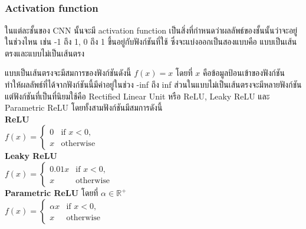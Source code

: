 \subsubsection{Activation function\textsuperscript{\cite{activation}}}
ในแต่ละชั้นของ CNN นั้นจะมี activation function เป็นสิ่งที่กำหนดว่าผลลัพธ์ของชั้นนั้นว่าจะอยู่ในช่วงไหน 
เช่น -1 ถึง 1, 0 ถึง 1 ขึ้นอยู่กับฟังก์ชันที่ใช้ ซึ่งจะแบ่งออกเป็นสองแบบคือ แบบเป็นเส้นตรงและแบบไม่เป็นเส้นตรง

แบบเป็นเส้นตรงจะมีสมการของฟังก์ชันดังนี้ $ f(x) = x $ โดยที่ $x$ คือข้อมูลป้อนเข้าของฟังก์ชัน ทำให้ผลลัพธ์ที่ได้จากฟังก์ชันนี้มีค่าอยู่ในช่วง -inf ถึง inf
ส่วนในแบบไม่เป็นเส้นตรงจะมีหลายฟังก์ชัน แต่ฟังก์ชันที่เป็นที่นิยมใช้คือ Rectified Linear Unit หรือ ReLU, Leaky ReLU และ Parametric ReLU โดยทั้งสามฟังก์ชันมีสมการดังนี้\\
\textbf{ReLU}\\
$ f(x) =
\begin{cases}
	0 & \text{if } x < 0,\\
	x & \text{otherwise}
\end{cases}
$\\
\textbf{Leaky ReLU}\\
$ f(x) =
\begin{cases}
	0.01x & \text{if } x < 0,\\
	x & \text{otherwise}
\end{cases}
$\\
\textbf{Parametric ReLU} โดยที่ $\alpha\in\mathbb{R^+}$\\
$ f(x) =
\begin{cases}
	\alpha x & \text{if } x < 0,\\
	x & \text{otherwise}
\end{cases}
$
